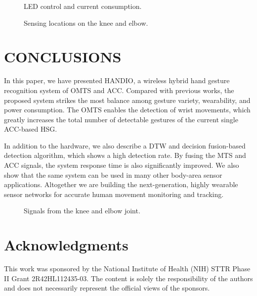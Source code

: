 \begin{figure}[t]
\centering
{}
\caption{LED control and current consumption.}
\end{figure}

\begin{figure}[t]
\centering
{}
\caption{Sensing locations on the knee and elbow.}
\end{figure}

\section{CONCLUSIONS}
In this paper, we have presented HANDIO, a wireless
hybrid hand gesture recognition system of OMTS and ACC.
Compared with previous works, the proposed system strikes
the most balance among gesture variety, wearability, and power
consumption. The OMTS enables the detection of wrist movements,
which greatly increases the total number of detectable
gestures of the current single ACC-based HSG.

In addition to the hardware, we also describe a DTW
and decision fusion-based detection algorithm, which shows
a high detection rate. By fusing the MTS and ACC signals,
the system response time is also significantly improved. We
also show that the same system can be used in many other
body-area sensor applications. Altogether we are building the
next-generation, highly wearable sensor networks for accurate
human movement monitoring and tracking.

\clearpage

\begin{figure}[t]
\centering
{}
\end{figure}

\begin{figure}[t]
\centering
{}
\caption{Signals from the knee and elbow joint.}
\end{figure}

\section*{Acknowledgments}
This work was sponsored by the National Institute of
Health (NIH) STTR Phase II Grant 2R42HL112435-03. The
content is solely the responsibility of the authors and does not
necessarily represent the official views of the sponsors.
